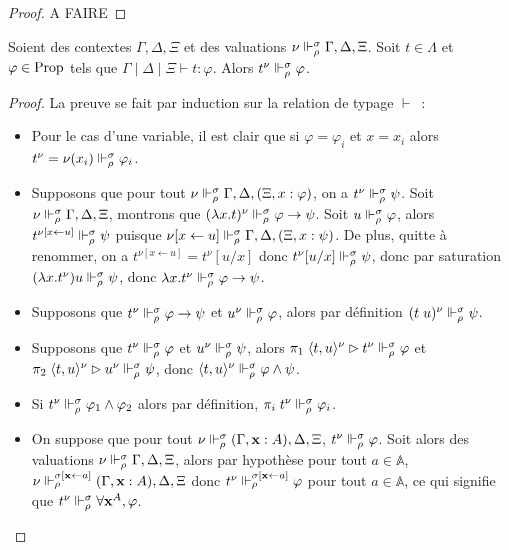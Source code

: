 \documentclass{article}
\begin{document}
\begin{proof}
  A FAIRE
\end{proof}

\begin{lem}[Adéquation]
  Soient des contextes $\Gamma,\Delta,\Xi$ et des valuations $\nu\Vdash_\rho^\sigma \Gamma,\Delta,\Xi$. Soit $t\in\Lambda$ et $\varphi\in\mathrm{Prop}$ tels que $\Gamma\mid\Delta\mid\Xi\vdash t : \varphi$. Alors $t^\nu \Vdash_\rho^\sigma \varphi$.
\end{lem}

\begin{proof}
  La preuve se fait par induction sur la relation de typage $\vdash$~:
  \begin{itemize}
  \item Pour le cas d'une variable, il est clair que si $\varphi = \varphi_i$ et $x = x_i$ alors $t^\nu = \nu(x_i)\Vdash_\rho^\sigma \varphi_i$.
  \item Supposons que pour tout $\nu \Vdash_\rho^\sigma \Gamma,\Delta,(\Xi, x : \varphi)$, on a $t^\nu \Vdash_\rho^\sigma \psi$. Soit $\nu \Vdash_\rho^\sigma \Gamma,\Delta,\Xi$, montrons que $(\lambda x.t)^\nu\Vdash_\rho^\sigma \varphi \to \psi$. Soit $u \Vdash_\rho^\sigma \varphi$, alors $t^{\nu[x \leftarrow u]}\Vdash_\rho^\sigma \psi$ puisque $\nu[x\leftarrow u]\Vdash_\rho^\sigma \Gamma,\Delta,(\Xi, x : \psi)$. De plus, quitte à renommer, on a $t^{\nu[x\leftarrow u]} = t^\nu[u/x]$ donc $t^\nu[u/x]\Vdash_\rho^\sigma \psi$, donc par saturation $(\lambda x.t^\nu) u \Vdash_\rho^\sigma \psi$, donc $\lambda x.t^\nu\Vdash_\rho^\sigma \varphi\to\psi$.
  \item Supposons que $t^\nu\Vdash_\rho^\sigma \varphi \to \psi$ et $u^\nu\Vdash_\rho^\sigma \varphi$, alors par définition $(t\;u)^\nu\Vdash_\rho^\sigma \psi$.
  \item Supposons que $t^\nu\Vdash_\rho^\sigma \varphi$ et $u^\nu\Vdash_\rho^\sigma \psi$, alors $\pi_1\;\langle t,u\rangle^\nu \rhd t^\nu \Vdash_\rho^\sigma \varphi$ et $\pi_2\;\langle t,u\rangle^\nu\rhd u^\nu \Vdash_\rho^\sigma \psi$, donc $\langle t,u\rangle^\nu \Vdash_\rho^\sigma \varphi\land\psi$.
  \item Si $t^\nu \Vdash_\rho^\sigma \varphi_1\land\varphi_2$ alors par définition, $\pi_i\;t^\nu\Vdash_\rho^\sigma \varphi_i$.
  \item On suppose que pour tout $\nu\Vdash_\rho^\sigma (\Gamma, \mathbf{x} : A), \Delta,\Xi$, $t^\nu\Vdash_\rho^\sigma \varphi$. Soit alors des valuations $\nu\Vdash_\rho^\sigma \Gamma,\Delta,\Xi$, alors par hypothèse pour tout $a \in \mathbb A$, $\nu\Vdash_\rho^{\sigma[\mathbf{x}\leftarrow a]}(\Gamma, \mathbf{x} : A), \Delta, \Xi$ donc $t^\nu\Vdash_\rho^{\sigma[\mathbf{x} \leftarrow a]}\varphi$ pour tout $a\in \mathbb A$, ce qui signifie que $t^\nu \Vdash_\rho^\sigma \forall \mathbf{x}^A, \varphi$.

\end{itemize}
\end{proof}
\end{document}
